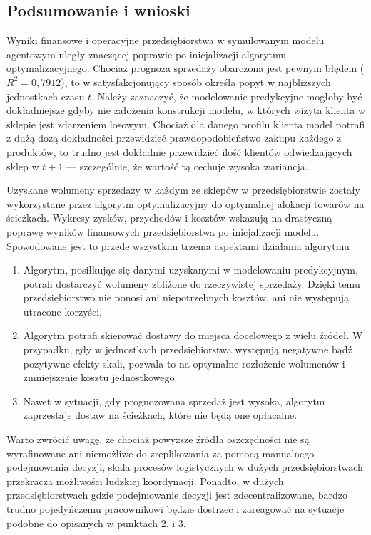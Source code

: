 \documentclass[polish, twoside, 12pt, a4paper]{article}
\theoremstyle{definition}
\theoremstyle{plain}
\theoremstyle{remark}
\begin{document}
\subsection{Podsumowanie i wnioski}

Wyniki finansowe i operacyjne przedsiębiorstwa w symulowanym modelu agentowym uległy znaczącej poprawie po inicjalizacji algorytmu optymalizacyjnego. Chociaż prognoza sprzedaży obarczona jest pewnym błędem ($R^2 = 0,7912$), to w satysfakcjonujący sposób określa popyt w najbliższych jednostkach czasu $t$. Należy zaznaczyć, że modelowanie predykcyjne mogłoby być dokładniejsze gdyby nie założenia konstrukcji modelu, w których wizyta klienta w sklepie jest zdarzeniem losowym. Chociaż dla danego profilu klienta model potrafi z dużą dozą dokładności przewidzieć prawdopodobieństwo zakupu każdego z produktów, to trudno jest dokładnie przewidzieć ilość klientów odwiedzających sklep w $t+1$ --- szczególnie, że wartość tą cechuje wysoka wariancja.

Uzyskane wolumeny sprzedaży w każdym ze sklepów w przedsiębiorstwie zostały wykorzystane przez algorytm optymalizacyjny do optymalnej alokacji towarów na ścieżkach. Wykresy zysków, przychodów i kosztów wskazują na drastyczną poprawę wyników finansowych przedsiębiorstwa po inicjalizacji modelu. Spowodowane jest to przede wszystkim trzema aspektami działania algorytmu

	\begin{enumerate}
		\item Algorytm, posiłkując się danymi uzyskanymi w modelowaniu predykcyjnym, potrafi dostarczyć wolumeny zbliżone do rzeczywistej sprzedaży. Dzięki temu przedsiębiorstwo nie ponosi ani niepotrzebnych kosztów, ani nie występują utracone korzyści,
		\item Algorytm potrafi skierować dostawy do miejsca docelowego z wielu źródeł. W przypadku, gdy w jednostkach przedsiębiorstwa występują negatywne bądź pozytywne efekty skali, pozwala to na optymalne rozłożenie wolumenów i zmniejszenie kosztu jednostkowego.
		\item Nawet w sytuacji, gdy prognozowana sprzedaż jest wysoka, algorytm zaprzestaje dostaw na ścieżkach, które nie będą one opłacalne.
	\end{enumerate}

 Warto zwrócić uwagę, że chociaż powyższe źródła oszczędności nie są wyrafinowane ani niemożliwe do zreplikowania za pomocą manualnego podejmowania decyzji, skala procesów logistycznych w dużych przedsiębiorstwach przekracza możliwości ludzkiej koordynacji. Ponadto, w dużych przedsiębiorstwach gdzie podejmowanie decyzji jest zdecentralizowane, bardzo trudno pojedyńczemu pracownikowi będzie dostrzec i zareagować na sytuacje podobne do opisanych w punktach 2. i 3. 
\end{document}
